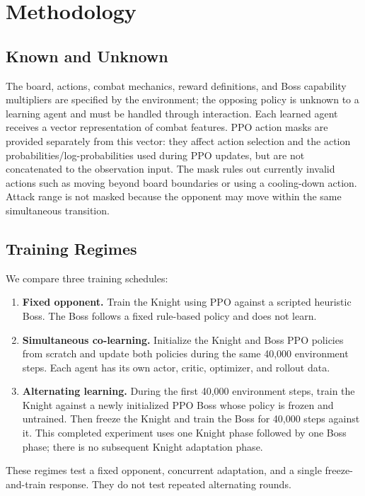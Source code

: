 \documentclass{article}
\begin{document}
\section{Methodology}
\subsection{Known and Unknown}
The board, actions, combat mechanics, reward definitions, and Boss capability multipliers are specified by the environment; the opposing policy is unknown to a learning agent and must be handled through interaction. Each learned agent receives a vector representation of combat features. PPO action masks are provided separately from this vector: they affect action selection and the action probabilities/log-probabilities used during PPO updates, but are not concatenated to the observation input. The mask rules out currently invalid actions such as moving beyond board boundaries or using a cooling-down action. Attack range is not masked because the opponent may move within the same simultaneous transition.

\subsection{Training Regimes}
We compare three training schedules:
\begin{enumerate}[leftmargin=*,itemsep=1pt]
\item \textbf{Fixed opponent.} Train the Knight using PPO against a scripted heuristic Boss. The Boss follows a fixed rule-based policy and does not learn.
\item \textbf{Simultaneous co-learning.} Initialize the Knight and Boss PPO policies from scratch and update both policies during the same 40,000 environment steps. Each agent has its own actor, critic, optimizer, and rollout data.
\item \textbf{Alternating learning.} During the first 40,000 environment steps, train the Knight against a newly initialized PPO Boss whose policy is frozen and untrained. Then freeze the Knight and train the Boss for 40,000 steps against it. This completed experiment uses one Knight phase followed by one Boss phase; there is no subsequent Knight adaptation phase.
\end{enumerate}
These regimes test a fixed opponent, concurrent adaptation, and a single freeze-and-train response. They do not test repeated alternating rounds.
\end{document}
